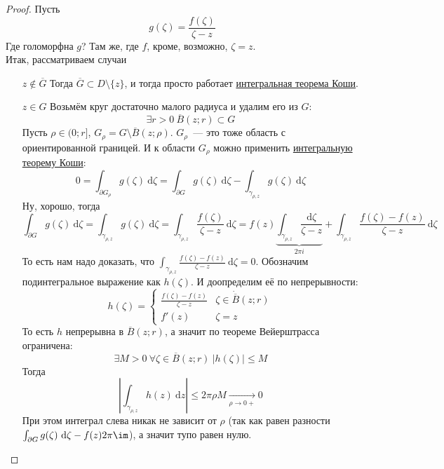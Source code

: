 \documentclass{article}
\begin{document}
    \begin{proof}
        Пусть
        $$
        g(\zeta)=\frac{f(\zeta)}{\zeta-z}
        $$
        Где голоморфна $g$? Там же, где $f$, кроме, возможно, $\zeta=z$.\\
        Итак, рассматриваем случаи
        \begin{itemize}
            \item[$z\notin\overline G$] Тогда $\overline G\subset D\setminus\{z\}$, и тогда просто работает \hyperref[Интегральная теорема Коши]{интегральная теорема Коши}.
            \item[$z\in G$] Возьмём круг достаточно малого радиуса и удалим его из $G$:
            $$
            \exists r>0~\overline B(z;r)\subset G
            $$
            Пусть $\rho\in(0;r]$, $G_\rho=G\setminus\overline B(z;\rho)$. $G_\rho$~--- это тоже область с ориентированной границей. И к области $G_\rho$ можно применить \hyperref[Интегральная теорема Коши]{интегральную теорему Коши}:
            $$
            0=\int_{\partial G_\rho}g(\zeta)~\mathrm d\zeta=\int_{\partial G}g(\zeta)~\mathrm d\zeta-\int_{\gamma_{\rho,z}}g(\zeta)~\mathrm d\zeta
            $$
            Ну, хорошо, тогда
            $$
            \int_{\partial G}g(\zeta)~\mathrm d\zeta=\int_{\gamma_{\rho,z}}g(\zeta)~\mathrm d\zeta=\int_{\gamma_{\rho,z}}\frac{f(\zeta)}{\zeta-z}~\mathrm d\zeta=f(z)\underbrace{\int_{\gamma_{\rho,z}}\frac{\mathrm d\zeta}{\zeta-z}}_{2\pi i}+\int_{\gamma_{\rho,z}}\frac{f(\zeta)-f(z)}{\zeta-z}~\mathrm d\zeta
            $$
            То есть нам надо доказать, что $\int_{\gamma_{\rho,z}}\frac{f(\zeta)-f(z)}{\zeta-z}~\mathrm d\zeta=0$. Обозначим подинтегральное выражение как $h(\zeta)$. И доопределим её по непрерывности:
            $$
            h(\zeta)=\begin{cases}
                \frac{f(\zeta)-f(z)}{\zeta-z} & \zeta\in\dot{\overline{B}}(z;r)\\
                f'(z)&\zeta=z
            \end{cases}
            $$
            То есть $h$ непрерывна в $\overline{B}(z;r)$, а значит по теореме Вейерштрасса ограничена:
            $$\exists M>0~\forall\zeta\in\overline B(z;r)~|h(\zeta)|\leqslant M$$ 
            Тогда
            $$
            \left|\int_{\gamma_{\rho,z}}h(z)~\mathrm dz\right|\leqslant2\pi\rho M\underset{\rho\to0+}\longrightarrow0
            $$
            При этом интеграл слева никак не зависит от $\rho$ (так как равен разности $\int_{\partial G}g(\zeta)~\mathrm d\zeta-f(z)2\pi\im$), а значит тупо равен нулю.
        \end{itemize}
    \end{proof}
\end{document}
